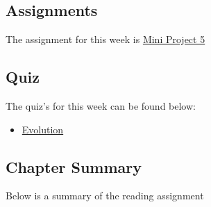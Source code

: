 \subsection{Assignments}

The assignment for this week is \href{https://applied.cs.colorado.edu/mod/assign/view.php?id=49453}{Mini Project 5}  

\subsection{Quiz}

The quiz's for this week can be found below:

\begin{itemize}
    \item \href{https://applied.cs.colorado.edu/mod/quiz/view.php?id=49436}{Evolution}  
\end{itemize}

\subsection{Chapter Summary}

Below is a summary of the reading assignment